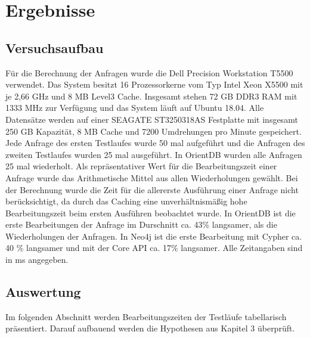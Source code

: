 
\chapter{Ergebnisse} %

\label{Kaptiel4} %

\section{Versuchsaufbau}
Für die Berechnung der Anfragen wurde die Dell Precision Workstation T5500 verwendet. Das System besitzt 16 Prozessorkerne vom Typ Intel Xeon  X5500 mit je 2,66 GHz und  8 MB Level3 Cache. Insgesamt stehen 72 GB DDR3 RAM mit 1333 MHz zur Verfügung und das System läuft auf Ubuntu 18.04. Alle Datensätze werden auf einer SEAGATE ST3250318AS Festplatte mit insgesamt 250 GB Kapazität, 8 MB Cache und 7200 Umdrehungen pro Minute gespeichert.\newline
 Jede Anfrage des ersten Testlaufes wurde 50 mal aufgeführt und die Anfragen des zweiten Testlaufes wurden 25 mal ausgeführt. In OrientDB wurden alle Anfragen 25 mal wiederholt. Als repräsentativer Wert für die Bearbeitungszeit einer Anfrage  wurde das Arithmetische Mittel aus allen Wiederholungen gewählt. Bei der Berechnung wurde die Zeit für die allererste Ausführung einer Anfrage nicht berücksichtigt, da durch das Caching eine unverhältnismäßig hohe Bearbeitungszeit beim ersten Ausführen beobachtet wurde. In OrientDB ist die erste Bearbeitungen der Anfrage im Durschnitt ca. 43\% langsamer, als die Wiederholungen  der Anfragen. In Neo4j ist die erste Bearbeitung mit Cypher ca. 40 \% langsamer und mit der Core API ca. 17\% langsamer.  Alle Zeitangaben sind in ms angegeben. 
\section{Auswertung}
Im folgenden Abschnitt werden Bearbeitungszeiten der Testläufe tabellarisch präsentiert.  Darauf aufbauend werden die Hypothesen aus Kapitel 3 überprüft.  
